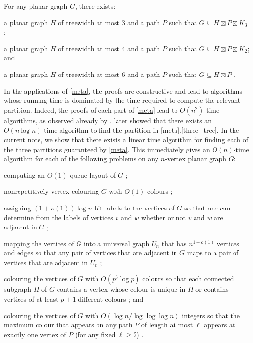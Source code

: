 \documentclass{patmorin}
\begin{document}
\begin{thm}\label{meta}
  For any planar graph $G$, there exists:
  \begin{compactenum}[(a)]
    \item \label{three_tree} a planar graph $H$ of treewidth at most $3$ and a path $P$ such that $G\subseteq H\boxtimes P\boxtimes K_3$ \cite{dujmovic.joret.ea:planar};
    \item \label{four_tree} a planar graph $H$ of treewidth at most $4$ and a path $P$ such that $G\subseteq H\boxtimes P\boxtimes K_2$; and
    \item \label{six_tree} a planar graph $H$ of treewidth at most $6$ and a path $P$ such that $G\subseteq H\boxtimes P$ \cite{ueckerdt.wood.ea:improved}.
  \end{compactenum}
\end{thm}

In the applications of \cref{meta}, the proofs are constructive and lead to algorithms whose running-time is dominated by the time required to compute the relevant partition. Indeed, the proofs of each part of \cref{meta} lead to $O(n^2)$ time algorithms, as observed already by \citet{dujmovic.joret.ea:planar}.  \citet{morin:fast} later showed that there exists an $O(n\log n)$ time algorithm to find the partition in \cref{meta}.\ref{three_tree}.  In the current note, we show that there exists a linear time algorithm for finding each of the three partitions guaranteed by \cref{meta}.  This immediately gives an $O(n)$-time algorithm for each of the following problems on any $n$-vertex planar graph $G$:
\begin{compactitem}
  \item computing an $O(1)$-queue layout of $G$ \cite{dujmovic.joret.ea:planar};
  \item nonrepetitively vertex-colouring $G$ with $O(1)$ colours \cite{dujmovic.esperet.ea:planar};
  \item assigning $(1+o(1))\log n$-bit labels to the vertices of $G$ so that one can determine from the labels of vertices $v$ and $w$ whether or not $v$ and $w$ are adjacent in $G$ \cite{dujmovic.esperet.ea:adjacency};
  \item mapping the vertices of $G$ into a universal graph $U_n$ that has $n^{1+o(1)}$ vertices and edges so that any pair of vertices that are adjacent in $G$ maps to a pair of vertices that are adjacent in $U_n$ \cite{esperet.joret.ea:sparse};
  \item colouring the vertices of $G$ with $O(p^3\log p)$ colours so that each connected subgraph $H$ of $G$ contains a vertex whose colour is unique in $H$ or contains vertices of at least $p+1$ different colours \cite{debski.felsner.ea:improved}; and
  \item colouring the vertices of $G$ with $O(\log n/\log\log\log n)$ integers so that the maximum colour that appears on any path $P$ of length at most $\ell$ appears at exactly one vertex of $P$ (for any fixed $\ell\ge 2$) \cite{bose.dujmovic.ea:asymptotically}.
\end{compactitem}
\end{document}
